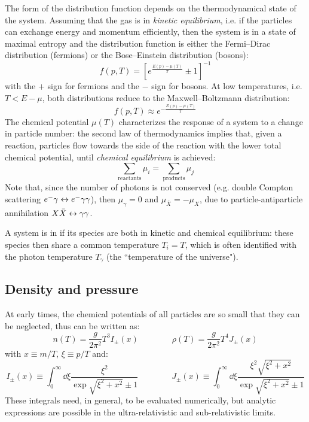 The form of the distribution function depends on the thermodynamical state of the system. Assuming that the gas is in \emph{kinetic equilibrium}, i.e. if the particles can exchange energy and momentum efficiently, then the system is in a state of maximal entropy and the distribution function is either the Fermi--Dirac distribution (fermions) or the Bose--Einstein distribution (bosons):
\begin{equation}
  f(p,T) = \left[ e^\frac{E(p) - \mu(T)}{T} \pm 1 \right]^{-1}
\end{equation}
with the $ + $ sign for fermions and the $ - $ sign for bosons. At low temperatures, i.e. $ T < E - \mu $, both distributions reduce to the Maxwell--Boltzmann distribution:
\begin{equation}
  f(p,T) \approx e^{- \frac{E(p) - \mu(T)}{T}}
\end{equation}
The chemical potential $ \mu(T) $ characterizes the response of a system to a change in particle number: the second law of thermodynamics implies that, given a reaction, particles flow towards the side of the reaction with the lower total chemical potential, until \emph{chemical equilibrium} is achieved:
\begin{equation*}
  \sum_\text{reactants} \mu_i = \sum_\text{products} \mu_j
\end{equation*}
Note that, since the number of photons is not conserved (e.g. double Compton scattering $ e^- \gamma \leftrightarrow e^- \gamma \gamma $), then $ \mu_\gamma = 0 $ and $ \mu_{\bar{X}} = - \mu_X $, due to particle-antiparticle annihilation $ X \bar{X} \leftrightarrow \gamma \gamma $.

A system is in  if its species are both in kinetic and chemical equilibrium: these species then share a common temperature $ T_i = T $, which is often identified with the photon temperature $ T_\gamma $ (the ``temperature of the universe").

\subsection{Density and pressure}

At early times, the chemical potentials of all particles are so small that they can be neglected, thus  can be written as:
\begin{equation}
  n(T) = \frac{g}{2\pi^2} T^3 I_\pm(x)
  \qquad \qquad
  \rho(T) = \frac{g}{2\pi^2} T^4 J_\pm(x)
  \label{eq:exact-rho}
\end{equation}
with $ x \equiv m / T $, $ \xi \equiv p / T $ and:
\begin{equation}
  I_\pm(x) \equiv \int_0^\infty \dd \xi \frac{\xi^2}{\exp \sqrt{\xi^2 + x^2} \pm 1}
  \qquad \qquad
  J_\pm(x) \equiv \int_0^\infty \dd \xi \frac{\xi^2 \sqrt{\xi^2 + x^2}}{\exp \sqrt{\xi^2 + x^2} \pm 1}
  \label{eq:integrals}
\end{equation}
These integrals need, in general, to be evaluated numerically, but analytic expressions are possible in the ultra-relativistic and sub-relativistic limits.

